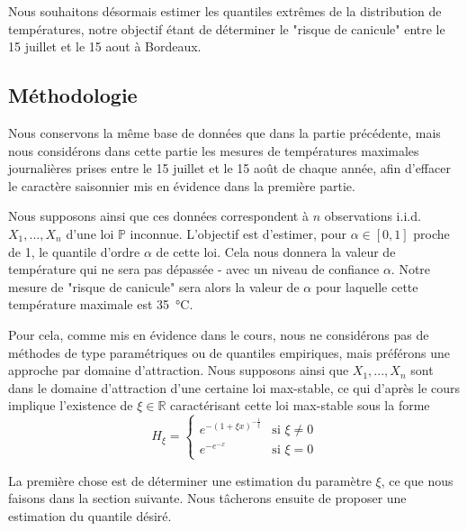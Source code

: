 \documentclass[../report.tex]{subfiles}
\begin{document}
\par Nous souhaitons désormais estimer les quantiles extrêmes de la distribution de températures, notre objectif étant de déterminer le "risque de canicule" entre le 15 juillet et le 15 aout à Bordeaux.


\subsection{Méthodologie}

\par Nous conservons la même base de données que dans la partie précédente, mais nous considérons dans cette partie les mesures de températures maximales journalières prises entre le 15 juillet et le 15 août de chaque année, afin d'effacer le caractère saisonnier mis en évidence dans la première partie.

\par Nous supposons ainsi que ces données correspondent à $n$ observations i.i.d. $X_1, ..., X_n$ d'une loi $\mathbb{P}$ inconnue. L'objectif est d'estimer, pour $\alpha \in \left[0, 1 \right]$ proche de 1, le quantile d'ordre $\alpha$ de cette loi. Cela nous donnera la valeur de température qui ne sera pas dépassée - avec un niveau de confiance $\alpha$. Notre mesure de "risque de canicule" sera alors la valeur de $\alpha$ pour laquelle cette température maximale est \SI{35}{\celsius}.

\par Pour cela, comme mis en évidence dans le cours, nous ne considérons pas de méthodes de type paramétriques ou de quantiles empiriques, mais préférons une approche par domaine d'attraction. Nous supposons ainsi que $X_1, ..., X_n$ sont dans le domaine d'attraction d'une certaine loi max-stable, ce qui d'après le cours implique l'existence de $\xi \in \mathbb{R}$ caractérisant cette loi max-stable sous la forme
\begin{displaymath}
H_{\xi} = 
	\begin{cases}
	e^{- {\left( 1 + \xi x \right)}^{-\frac{1}{\xi}}} &\text{si } \xi \neq 0 \\
	e^{-e^{-x}} &\text{si } \xi = 0
	\end{cases}
\end{displaymath}

\par La première chose est de déterminer une estimation du paramètre $\xi$, ce que nous faisons dans la section suivante. Nous tâcherons ensuite de proposer une estimation du quantile désiré.
\end{document}
